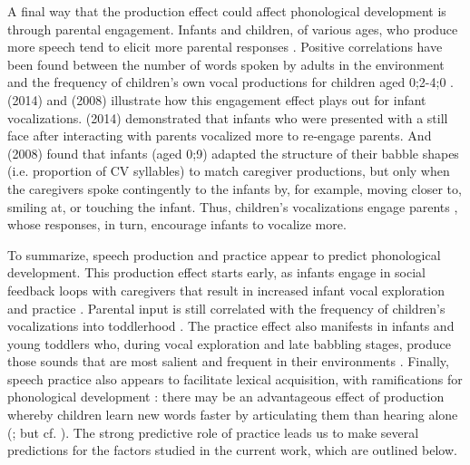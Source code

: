 \documentclass[a4paper,man,natbib,donotrepeattitle, apacite]{apa6}
\begin{document}
A final way that the production effect could affect phonological development is through parental engagement. Infants and children, of various ages, who produce more speech tend to elicit more parental responses \cite{franklinEffectsParentalInteraction2014,goldsteinSocialFeedbackInfants2008,mcgillionWhatPavesWay2017,pretzerInfantadultVocalInteraction2019,warlaumontSocialFeedbackLoop2014}. Positive correlations have been found between the number of words spoken by adults in the environment and the frequency of children’s own vocal productions for children aged 0;2-4;0 \cite{gilkersonImpactAdultTalk2009,orenaReliabilityLanguageEnvironment2019,weislederTalkingChildrenMatters2013}. \citeauthor{franklinEffectsParentalInteraction2014} (2014) and \citeauthor{goldsteinSocialFeedbackInfants2008} (2008) illustrate how this engagement effect plays out for infant vocalizations. \citeauthor{franklinEffectsParentalInteraction2014} (2014) demonstrated that infants who were presented with a still face after interacting with parents vocalized more to re-engage parents. And \citeauthor{goldsteinSocialFeedbackInfants2008} (2008) found that infants (aged 0;9) adapted the structure of their babble shapes (i.e. proportion of CV syllables) to match caregiver productions, but only when the caregivers spoke contingently to the infants by, for example, moving closer to, smiling at, or touching the infant. Thus, children’s vocalizations engage parents \cite{albertSocialFunctionsBabbling2018}, whose responses, in turn, encourage infants to vocalize more. 

To summarize, speech production and practice appear to predict phonological development. This production effect starts early, as infants engage in social feedback loops with caregivers that result in increased infant vocal exploration and practice \cite{franklinEffectsParentalInteraction2014,goldsteinSocialFeedbackInfants2008,mcgillionWhatPavesWay2017,pretzerInfantadultVocalInteraction2019,warlaumontSocialFeedbackLoop2014}. Parental input is still correlated with the frequency of children’s vocalizations into toddlerhood 
\cite{gilkersonImpactAdultTalk2009,weislederTalkingChildrenMatters2013}. The practice effect also manifests in infants and young toddlers who, during vocal exploration and late babbling stages, produce those sounds that are most salient and frequent in their environments \cite{depaolisProductionPatternsInfluence2011,depaolisInfluenceBabblingPatterns2013,laingBabbleWordsInfants2020,vihmanVariablePathsEarly1993,vihmanLearningWordsLearning2017}. Finally, speech practice also appears to facilitate lexical acquisition, with ramifications for phonological development \cite{sosaLexicalPhonologicalEffects2012,stoel-gammonRelationshipsLexicalPhonological2011,zamunerPhonotacticProbabilitiesOnset2009}: there may be an advantageous effect of production whereby children learn new words faster by articulating them than hearing alone (; but cf. ). The strong predictive role of practice leads us to make several predictions for the factors studied in the current work, which are outlined below. 
\end{document}
